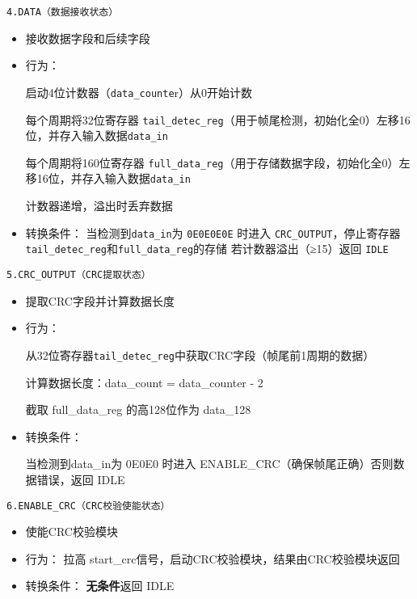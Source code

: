 \documentclass[12pt,]{article}
\begin{document}
\texttt{4.\hspace{0pt}DATA\hspace{0pt}（数据接收状态）}

\begin{itemize}
\item
  接收数据字段和后续字段
\item
  行为：

  启动4位计数器（\texttt{data\_counte}r）从0开始计数

  每个周期将32位寄存器
  \texttt{tail\_detec\_reg}（用于帧尾检测，初始化全0）左移16位，并存入输入数据\texttt{data\_in}

  每个周期将160位寄存器
  \texttt{full\_data\_reg}（用于存储数据字段，初始化全0）左移16位，并存入输入数据\texttt{data\_in}

  计数器递增，溢出时丢弃数据
\item
  转换条件： 当检测到\texttt{data\_in}为 \texttt{0E0E0E0E} 时进入
  \texttt{CRC\_OUTPUT}，停止寄存器\texttt{tail\_detec\_reg}和\texttt{full\_data\_reg}的存储
  若计数器溢出（≥15）返回 \texttt{IDLE}
\end{itemize}

\texttt{5.\hspace{0pt}CRC\_OUTPUT\hspace{0pt}（CRC提取状态）}

\begin{itemize}
\item
  提取CRC字段并计算数据长度
\item
  行为：

  从32位寄存器\texttt{tail\_detec\_reg}中获取CRC字段（帧尾前1周期的数据）

  计算数据长度：data\_count = data\_counter - 2

  截取 full\_data\_reg 的高128位作为 data\_128
\item
  转换条件：

  当检测到data\_in为 0E0E0 时进入
  ENABLE\_CRC（确保帧尾正确）否则数据错误，返回 IDLE
\end{itemize}

\texttt{6.\hspace{0pt}ENABLE\_CRC\hspace{0pt}（CRC校验使能状态）}

\begin{itemize}
\item
  使能CRC校验模块
\item
  行为： 拉高 start\_crc信号，启动CRC校验模块，结果由CRC校验模块返回
\item
  转换条件： \textbf{无条件}返回 IDLE
\end{itemize}
\end{document}
